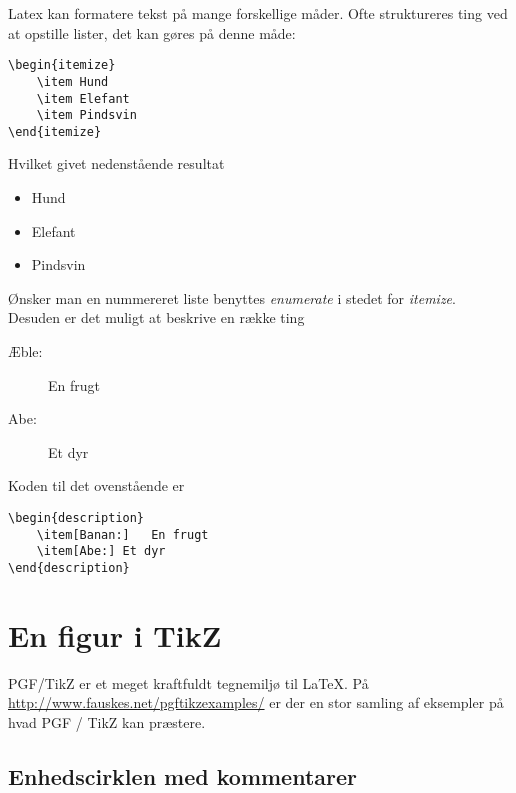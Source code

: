 \documentclass[11pt,a4paper,fleqn]{article}
\numberwithin{equation}{section}
\begin{document}
Latex kan formatere tekst på mange forskellige måder. 
Ofte struktureres ting ved at opstille lister, det kan gøres på denne måde:
%
\begin{lstlisting}
\begin{itemize}
	\item Hund
	\item Elefant
	\item Pindsvin
\end{itemize}
\end{lstlisting}
%
Hvilket givet nedenstående resultat
%
\begin{itemize}
	\item Hund
	\item Elefant
	\item Pindsvin
\end{itemize}
%
Ønsker man en nummereret liste benyttes \emph{enumerate} i stedet for \emph{itemize}.
%
Desuden er det muligt at beskrive en række ting
%
\begin{description}
	\item[Æble:] 	En frugt
	\item[Abe:]	Et dyr
\end{description}
%
Koden til det ovenstående er
%
\begin{lstlisting}
\begin{description}
	\item[Banan:] 	En frugt
	\item[Abe:]	Et dyr
\end{description}
\end{lstlisting}



\section{En figur i TikZ}

PGF/TikZ er et meget kraftfuldt tegnemiljø til \LaTeX .
På \url{http://www.fauskes.net/pgftikzexamples/} er der en stor
samling af eksempler på hvad PGF / TikZ kan præstere.


\subsection{Enhedscirklen med kommentarer}
\end{document}
